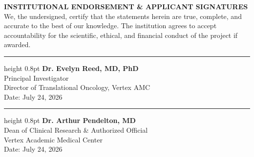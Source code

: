 \documentclass[10pt,a4paper]{article}
\begin{document}
\begin{center}
\begin{tcolorbox}[colback=white,colframe=PrimaryNavy,arc=2pt,boxrule=0.8pt,width=\textwidth]
\small
\textbf{\color{PrimaryNavy}INSTITUTIONAL ENDORSEMENT \& APPLICANT SIGNATURES} \\[0.2em]
We, the undersigned, certify that the statements herein are true, complete, and accurate to the best of our knowledge. The institution agrees to accept accountability for the scientific, ethical, and financial conduct of the project if awarded.

\vspace{0.8em}

\begin{minipage}[t]{0.45\textwidth}
  \color{PrimaryNavy}\hrule height 0.8pt \vspace{0.3em}
  \textbf{Dr. Evelyn Reed, MD, PhD} \\
  Principal Investigator \\
  Director of Translational Oncology, Vertex AMC \\
  Date: July 24, 2026
\end{minipage}%
\hfill
\begin{minipage}[t]{0.45\textwidth}
  \color{PrimaryNavy}\hrule height 0.8pt \vspace{0.3em}
  \textbf{Dr. Arthur Pendelton, MD} \\
  Dean of Clinical Research \& Authorized Official \\
  Vertex Academic Medical Center \\
  Date: July 24, 2026
\end{minipage}
\end{tcolorbox}
\end{center}
\end{document}
